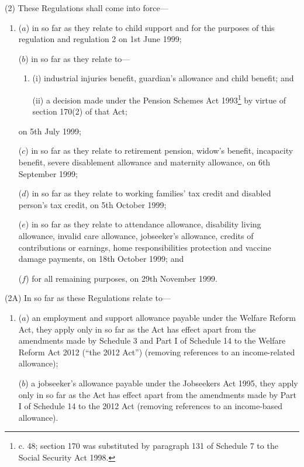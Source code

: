 \documentclass[12pt,a4paper]{article}
\begin{document}
(2) These Regulations shall come into force—
\begin{enumerate}\item[]
($a$) in so far as they relate to child support and for the purposes of this regulation and regulation 2 on 1st June 1999;

($b$) in so far as they relate to—
\begin{enumerate}\item[]
(i) industrial injuries benefit, guardian’s allowance and child benefit; and

(ii) a decision made under the Pension Schemes Act 1993\footnote{ c. 48; section 170 was substituted by paragraph 131 of Schedule 7 to the Social Security Act 1998.} by virtue of section 170(2) of that Act;
\end{enumerate}
on 5th July 1999;

($c$) in so far as they relate to retirement pension, widow’s benefit, incapacity benefit, severe disablement allowance and maternity allowance, on 6th September 1999;

($d$) in so far as they relate to
working families' tax credit and disabled person’s tax credit,  %
on 5th October 1999;

\pagebreak[3]

($e$) in so far as they relate to attendance allowance, disability living allowance, invalid care allowance, jobseeker’s allowance, credits of contributions or earnings, home responsibilities protection and vaccine damage payments, on 18th October 1999; and

($f$) for all remaining purposes, on 29th November 1999.
\end{enumerate}

(2A) In so far as these Regulations relate to—
\begin{enumerate}\item[]
($a$) an employment and support allowance payable under the Welfare Reform Act, they apply only in so far as the Act has effect apart from the amendments made by Schedule 3 and Part I of Schedule 14 to the Welfare Reform Act 2012 (“the 2012 Act”) (removing references to an income-related allowance);

($b$) a jobseeker’s allowance payable under the Jobseekers Act 1995, they apply only in so far as the Act has effect apart from the amendments made by Part I of Schedule 14 to the 2012 Act (removing references to an income-based allowance).
\end{enumerate}
\end{document}
